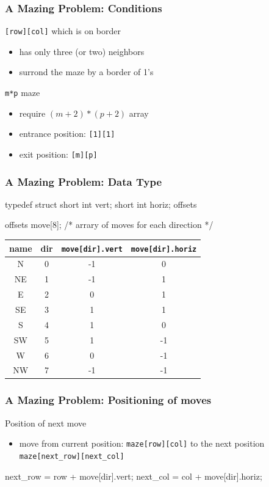 \documentclass[newPxFont,sthlmFooter,nooffset]{beamer}
\begin{document}
\begin{frame}[t]
  \frametitle{A Mazing Problem: Conditions}
\texttt{[row][col]} which is on border
\begin{itemize}
\item has only three (or two) neighbors
\item surrond the maze by a border of 1's
\end{itemize}

\bigskip
\texttt{m*p} maze
\begin{itemize}
\item require $(m+2) *(p+2)$ array
\item entrance position: \texttt{[1][1]}
\item exit position: \texttt{[m][p]}
\end{itemize}
\end{frame}

\begin{frame}[t, fragile]
  \frametitle{A Mazing Problem: Data Type}
\begin{ncodedef}
typedef struct {
    short int vert;
    short int horiz;
} offsets

offsets move[8]; /* arrary of moves for each direction */    
\end{ncodedef}

\begin{tabular}{c | c | c | c}
  name & dir & \texttt{move[dir].vert} & \texttt{move[dir].horiz} \\ \hline
N  &  0 & -1 &  0 \\
NE &  1 & -1 &  1 \\
E  &  2 &  0 &  1 \\
SE &  3 &  1 &  1 \\
S  &  4 &  1 &  0 \\
SW &  5 &  1 &  -1 \\
W  &  6 &  0 &  -1 \\
NW &  7 & -1 &  -1 \\
\end{tabular}
\end{frame}

\begin{frame}[t, fragile]
  \frametitle{A Mazing Problem: Positioning of moves}
Position of next move
\begin{itemize}
\item move from current position: \texttt{maze[row][col]} to the next position \texttt{maze[next\_row][next\_col]}
\end{itemize}
\begin{ncodedef}
next_row = row + move[dir].vert;
next_col = col + move[dir].horiz;
\end{ncodedef}
\end{frame}
\end{document}
